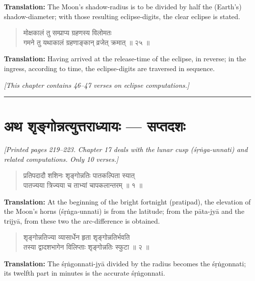 \documentclass[11pt,a4paper]{article}
\newcommand{\longline}{\noindent\rule{\textwidth}{0.4pt}}
\newcommand{\cnote}[1]{\textcolor{notecolor}{\textit{#1}}}
\newcommand{\dev}[1]{{\devanagarifont #1}}
\newcommand{\dsec}[1]{\section*{\dev{#1}}}
\newenvironment{shloka}{\begin{verse}\devanagarifont\large}{\end{verse}}
\begin{document}
\textbf{Translation:}\quad
The Moon's shadow-radius is to be divided by half the (Earth's)
shadow-diameter; with those resulting eclipse-digits, the clear
eclipse is stated.

\vspace{0.3cm}

\begin{shloka}
मोक्षकालं तु सम्प्राप्य ग्रहणस्य विलोमतः \\
गमने तु यथाकालं ग्रहणाङ्कान् व्रजेत् क्रमात् ॥ २५ ॥
\end{shloka}

\textbf{Translation:}\quad
Having arrived at the release-time of the eclipse, in reverse; in
the ingress, according to time, the eclipse-digits are traversed in
sequence.

\vspace{0.3cm}

\cnote{[This chapter contains 46–47 verses on eclipse computations.]}

\longline
\newpage

\dsec{अथ शृङ्गोन्नत्युत्तराध्यायः — सप्तदशः}

\cnote{[Printed pages 219–223. Chapter 17 deals with the lunar cusp
(śṛṅga-unnati) and related computations. Only 10 verses.]}

\begin{shloka}
प्रतिपदादौ शशिनः शृङ्गोन्नतिः पातकल्पिता स्यात् \\
पातज्यया त्रिज्यया च ताभ्यां चापकलान्तरम् ॥ १ ॥
\end{shloka}

\textbf{Translation:}\quad
At the beginning of the bright fortnight (pratipad), the elevation
of the Moon's horns (śṛṅga-unnati) is from the latitude; from the
pāta-jyā and the trijyā, from these two the arc-difference is obtained.

\vspace{0.3cm}

\begin{shloka}
शृङ्गोन्नतिज्या व्यासार्धेन हृता शृङ्गोन्नतिर्भवति \\
तस्या द्वादशभागेन विलिप्ताः शृङ्गोन्नतिः स्फुटा ॥ २ ॥
\end{shloka}

\textbf{Translation:}\quad
The śṛṅgonnati-jyā divided by the radius becomes the śṛṅgonnati;
its twelfth part in minutes is the accurate śṛṅgonnati.
\end{document}
